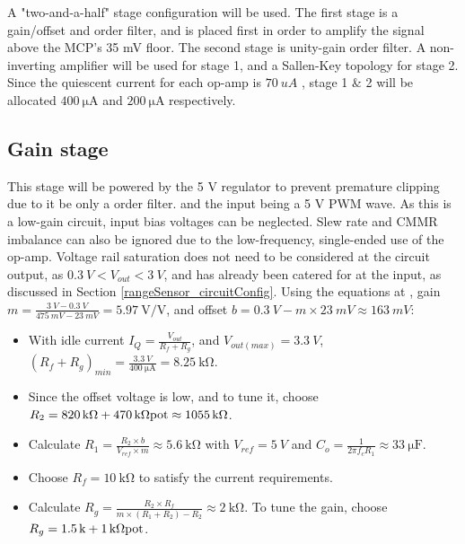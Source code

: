 A "two-and-a-half" stage configuration will be used. The first stage is a gain/offset and  order filter,
and is placed first in order to amplify the signal above the MCP's 35 mV floor. The second stage is unity-gain  order filter.
A non-inverting amplifier will be used for stage 1, and a Sallen-Key topology for stage 2. Since the quiescent current for each op-amp is
$\SI{70}{uA}$ \cite{datasheetMCP6242}, stage 1 \& 2 will be allocated $\SI{400}{\micro\ampere}$ and $\SI{200}{\micro\ampere}$ respectively.

\subsection{Gain stage}

This stage will be powered by the 5 V regulator to prevent premature clipping due to it be only a  order filter.
and the input being a 5 V PWM wave. As this is a low-gain circuit, input bias voltages can be neglected.
Slew rate and CMMR imbalance can also be ignored due to the low-frequency, single-ended use of the op-amp.
Voltage rail saturation does not need to be considered at the circuit output, as $\SI{0.3}{V} < V_{out} < \SI{3}{V}$,
and has already been catered for at the input, as discussed in Section \ref{rangeSensor_circuitConfig}.
Using the equations at \cite{gainOffset30Seconds}, gain $m = \frac{\SI{3}{V} - \SI{0.3}{V}}{\SI{475}{mV} - \SI{23}{mV}} = \SI{5.97}{\volt\per\volt}$,
and offset $b = \SI{0.3}{V} - m \times \SI{23}{mV} \approx \SI{163}{mV}$:

\begin{itemize}
  \item With idle current $I_Q = \frac{V_{out}}{R_f + R_g}$, and $V_{out(max)} = \SI{3.3}{V}$, $(R_f + R_g)_{min} = \frac{\SI{3.3}{V}}{\SI{400}{\micro\ampere}} = \SI{8.25}{\kilo\ohm}$.
  \item Since the offset voltage is low, and to tune it, choose $R_2 = \SI{820}{\kilo\ohm} + \SI{470}{\kilo\ohm} \textnormal{pot} \approx \SI{1055}{\kilo\ohm}$.
  \item Calculate $R_1 = \frac{R_2 \times b}{V_{ref} \times m} \approx \SI{5.6}{\kilo\ohm}$ with $V_{ref} = \SI{5}{V}$ and $C_o = \frac{1}{2 \pi f_c R_1} \approx \SI{33}{\micro\farad}$.
  \item Choose $R_f = \SI{10}{\kilo\ohm}$ to satisfy the current requirements.
  \item Calculate $R_g = \frac{R_2 \times R_f}{m \times (R_1 + R_2) - R_2} \approx \SI{2}{\kilo\ohm}$. To tune the gain, choose $R_g = \SI{1.5}{k} + \SI{1}{\kilo\ohm}\textnormal{pot}$.
\end{itemize}


